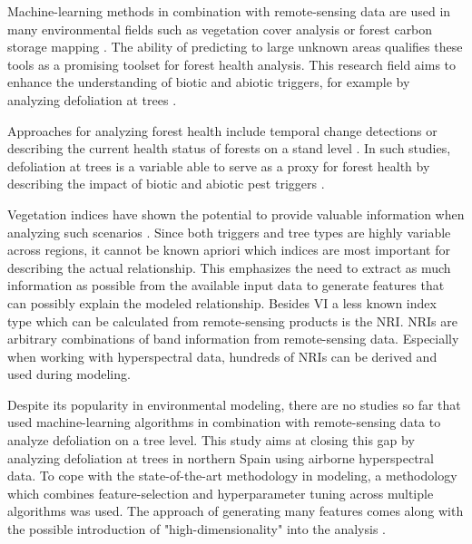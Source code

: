 \documentclass[letterpaper, journal]{IEEEtran}
\begin{document}

Machine-learning methods in combination with remote-sensing data are used in many environmental fields such as vegetation cover analysis or forest carbon storage mapping \cite{mascaro2014, urban2018}.
The ability of predicting to large unknown areas qualifies these tools as a promising toolset for forest health analysis.
This research field aims to enhance the understanding of biotic and abiotic triggers, for example by analyzing defoliation at trees \cite{hawrylo2018}.

Approaches for analyzing forest health include temporal change detections \cite{zhang2016} or describing the current health status of forests on a stand level \cite{townsend2012}.
In such studies, defoliation at trees is a variable able to serve as a proxy for forest health by describing the impact of biotic and abiotic pest triggers \cite{townsend2012, goodbody2018}.

Vegetation indices have shown the potential to provide valuable information when analyzing such scenarios \cite{jiang2014, adamczyk2015}.
Since both triggers and tree types are highly variable across regions, it cannot be known apriori which indices are most important for describing the actual relationship.
This emphasizes the need to extract as much information as possible from the available input data to generate features that can possibly explain the modeled relationship.
Besides \ac{VI} a less known index type which can be calculated from remote-sensing products is the \ac{NRI}.
\ac{NRI}s are arbitrary combinations of band information from remote-sensing data.
Especially when working with hyperspectral data, hundreds of \ac{NRI}s can be derived and used during modeling.


Despite its popularity in environmental modeling, there are no studies so far that used machine-learning algorithms in combination with remote-sensing data to analyze defoliation on a tree level.
This study aims at closing this gap by analyzing defoliation at trees in northern Spain using airborne hyperspectral data.
To cope with the state-of-the-art methodology in modeling, a methodology which combines feature-selection and hyperparameter tuning across multiple algorithms was used.
The approach of generating many features comes along with the possible introduction of "high-dimensionality" into the analysis \cite{trunk1979, xu2016}.
\end{document}
